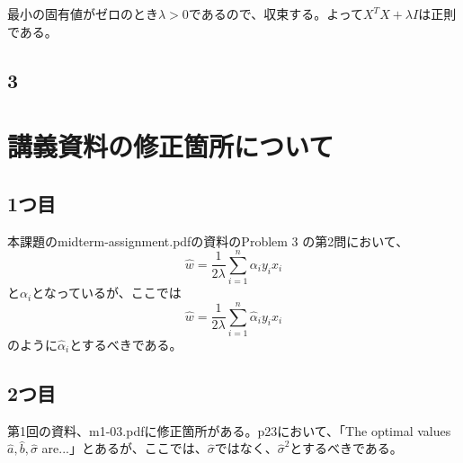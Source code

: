 \documentclass[a4j,11pt]{jarticle}
\begin{document}
最小の固有値がゼロのとき$\lambda > 0$であるので、収束する。よって$X^TX + \lambda I$は正則である。

\subsection*{3}

\section*{講義資料の修正箇所について}
\subsection*{1つ目}
本課題のmidterm-assignment.pdfの資料のProblem 3 の第2問において、
\begin{equation*}
    \hat{w} = \frac{1}{2\lambda} \sum_{i=1}^n \alpha_i y_i x_i
\end{equation*}
と$\alpha_i$となっているが、ここでは
\begin{equation*}
    \hat{w} = \frac{1}{2\lambda} \sum_{i=1}^n \hat{\alpha}_i y_i x_i
\end{equation*}
のように$\hat{\alpha}_i$とするべきである。

\subsection*{2つ目}
第1回の資料、m1-03.pdfに修正箇所がある。p23において、「The optimal values $\hat{a},\hat{b},\hat{\sigma}$ are...」とあるが、ここでは、$\hat{\sigma}$ではなく、$\hat{\sigma}^2$とするべきである。
\end{document}
